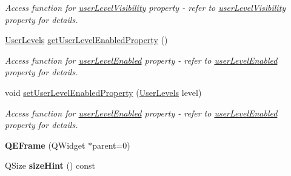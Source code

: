\begin{DoxyCompactItemize}
\begin{DoxyCompactList}\small\item\em Access function for \hyperlink{classQEFrame_af6b93bbb318228dd8debf550d8e35bd0}{userLevelVisibility} property -\/ refer to \hyperlink{classQEFrame_af6b93bbb318228dd8debf550d8e35bd0}{userLevelVisibility} property for details. \end{DoxyCompactList}\item 
\hypertarget{classQEFrame_a4c03b42682a7cdbeb181c2d0da071ab3}{
\hyperlink{classQEFrame_a7f512f888a2a6f46631a382597090503}{UserLevels} \hyperlink{classQEFrame_a4c03b42682a7cdbeb181c2d0da071ab3}{getUserLevelEnabledProperty} ()}
\label{classQEFrame_a4c03b42682a7cdbeb181c2d0da071ab3}

\begin{DoxyCompactList}\small\item\em Access function for \hyperlink{classQEFrame_af3d7163c6158e457d081c5de695bd064}{userLevelEnabled} property -\/ refer to \hyperlink{classQEFrame_af3d7163c6158e457d081c5de695bd064}{userLevelEnabled} property for details. \end{DoxyCompactList}\item 
\hypertarget{classQEFrame_a281a6dcc9f817f5c335df4de18f14ebb}{
void \hyperlink{classQEFrame_a281a6dcc9f817f5c335df4de18f14ebb}{setUserLevelEnabledProperty} (\hyperlink{classQEFrame_a7f512f888a2a6f46631a382597090503}{UserLevels} level)}
\label{classQEFrame_a281a6dcc9f817f5c335df4de18f14ebb}

\begin{DoxyCompactList}\small\item\em Access function for \hyperlink{classQEFrame_af3d7163c6158e457d081c5de695bd064}{userLevelEnabled} property -\/ refer to \hyperlink{classQEFrame_af3d7163c6158e457d081c5de695bd064}{userLevelEnabled} property for details. \end{DoxyCompactList}\item 
\hypertarget{classQEFrame_a220dcfa856b9da9133f445e2ae8dc1ed}{
{\bfseries QEFrame} (QWidget $\ast$parent=0)}
\label{classQEFrame_a220dcfa856b9da9133f445e2ae8dc1ed}

\item 
\hypertarget{classQEFrame_a8ecbbeada87e5438cc4647482acd4ca9}{
QSize {\bfseries sizeHint} () const }
\label{classQEFrame_a8ecbbeada87e5438cc4647482acd4ca9}

\end{DoxyCompactItemize}
